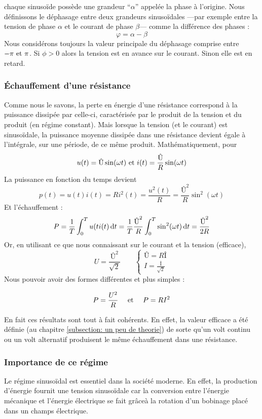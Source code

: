 \documentclass[12pt,a4paper]{article}
\newcommand{\I}{\text{Î} }
\newcommand{\U}{\text{Û} }
\begin{document}
 chaque sinusoïde possède une grandeur ``$\alpha$''  appelée la phase à l'origine. Nous définissons le déphasage entre deux grandeurs sinusoïdales ---par exemple entre la tension de phase $\alpha$ et le courant de phase $\beta$--- comme la différence des phases : 
\begin{equation}
	\varphi = \alpha - \beta
\end{equation}
Nous considérons toujours la valeur principale du déphasage comprise entre $-\pi \mbox{ et } \pi$. Si $\phi > 0$ alors la tension est en avance sur le courant. Sinon elle est en retard.

\subsubsection{Échauffement d'une résistance}
Comme nous le savons, la perte en énergie d'une résistance correspond à la puissance dissipée par celle-ci, caractérisée par le produit de la tension et du produit (en régime constant). Mais lorsque la tension (et le courant) est sinusoïdale, la puissance moyenne dissipée dans une résistance devient égale à l'intégrale, sur une période, de ce même produit. Mathématiquement, pour 
\[u(t) = \U \sin(\omega t) \et i(t) = \frac{\U}{R}\sin(\omega t)\]
La puissance en fonction du temps devient
\[p(t) = u(t)i(t) = Ri^2(t) = \frac{u^2(t)}{R} = \frac{\U^2}{R}\sin^2(\omega t)\]
Et l'échauffement :
\[P = \frac{1}{T}\int_0^T u(ti(t) \deriv{t} = \frac{1}{T}\frac{\U^2}{R}\int_0^T \sin^2(\omega t) \deriv{t} = \frac{\U^2}{2R}\]
Or, en utilisant ce que nous connaissant sur le courant et la tension (efficace), 
\[U = \frac{\U^2}{\sqrt{2}}  \qquad \left\{\begin{array}{l}
\U = R\I\\
I = \frac{\I}{\sqrt{2}}
\end{array}\right.\]
Nous pouvoir avoir des formes différentes et plus simples :	
\begin{boite}
	\begin{equation}
		P = \frac{U^2}{R} \quad \mbox{ et } \quad P = RI^2
	\end{equation}
\end{boite}
En fait ces résultats sont tout à fait cohérents. En effet, la valeur efficace a été définie (au chapitre \ref{subsection: un peu de theorie}) de sorte qu'un volt continu ou un volt alternatif produisent le même échauffement dans une résistance.
\subsubsection{Importance de ce régime}
Le régime sinusoïdal est essentiel dans la société moderne. En effet, la production d'énergie fournit une tension sinusoïdale car la conversion entre l'énergie mécanique et l'énergie électrique se fait grâceà la rotation d'un bobinage placé dans un champs électrique. 
\end{document}
